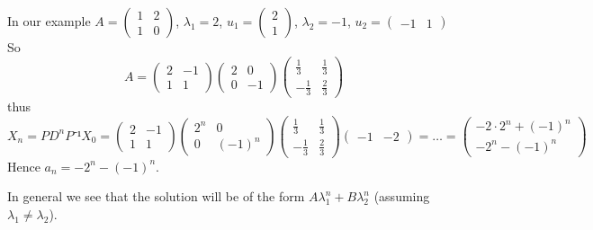 \documentclass[english]{lbscript}
\begin{document}
\begin{example}{}{}
In our example \(A=\begin{pmatrix} 1  & 2 \\ 1  & 0 \end{pmatrix}\), \(𝜆_{1}=2\), \(u_1= \begin{pmatrix}
2 \\ 1\end{pmatrix}\),
\(𝜆_{2}=-1\), \(u_2=\begin{pmatrix} -1&1\end{pmatrix}\)\\
                                                                                 So
\begin{equation}
\label{eq:66}
A = \begin{pmatrix} 2  & -1 \\ 1  & 1 \end{pmatrix}
\begin{pmatrix} 2  & 0 \\ 0  & -1 \end{pmatrix}
\begin{pmatrix} \frac{1}{3}  & \frac{1}{3} \\ -\frac{1}{3}  & \frac{2}{3} \end{pmatrix}
\end{equation}
thus
\begin{equation}
\label{eq:67}
X_{n}= PD^{n}P⁻¹ X_0 = \begin{pmatrix} 2  & -1 \\ 1  & 1 \end{pmatrix}
\begin{pmatrix} 2^{n}  & 0 \\ 0  & (-1)^{n} \end{pmatrix}
\begin{pmatrix} \frac{1}{3}  & \frac{1}{3} \\ -\frac{1}{3}  & \frac{2}{3} \end{pmatrix} \begin{pmatrix} -1 & -2 \end{pmatrix} = \dots =
\begin{pmatrix} -2⋅2^{n} + (-1)^{n} \\ -2^{n} - (-1)^{n} \end{pmatrix}
\end{equation}
Hence \(a_n=-2^{n}-(-1)^{n}\).

In general we see that the solution will be of the form \(A 𝜆_{1}^{n}+B 𝜆_{2}^{n}\) (assuming \(𝜆_{1}≠𝜆_{2}\)).
\end{example}
\end{document}
